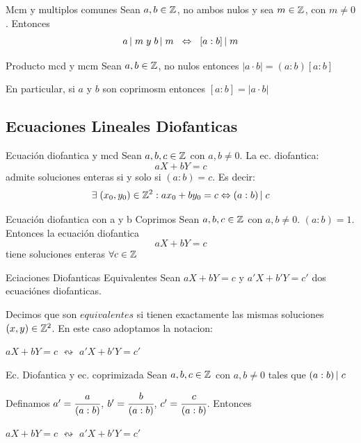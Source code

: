 \documentclass[10pt]{article}
\begin{document}
\begin{cor}{Mcm y multiplos comunes}
 Sean $a, b \in \entero{}$, no ambos nulos y sea $m \in \entero{}$, con $m \neq 0$. Entonces
 \[\divi{a}{m} \es{0.1} y \es{0.1} \divi{b}{m} \es{0.2} \sii \es{0.2}\divi{[a:b]}{m}\]
\end{cor}

\begin{propo}{Producto mcd y mcm}
Sean $a, b \in \entero{}$, no nulos entonces $|a \cdot b| = (a:b)[a:b]$

En particular, si $a$ y $b$ son coprimosm entonces $[a:b] = |a \cdot b|$
\end{propo}

\begin{center}
\subsection{Ecuaciones Lineales Diofanticas} 
\end{center}

\begin{propo}{Ecuación diofantica y mcd}
Sean $a,b,c \in \entero{}$ con $a,b \neq 0$. La ec. diofantica:
\[aX + bY =c\]
admite soluciones enteras si y solo si $(a:b) = c$. Es decir:
\[\exists \es{0.1} (x_0, y_0) \in \entero{2} : a x_0 + b y_0 = c \sii \divi{(a:b)}{c}\]
\end{propo}

\begin{cor}{Ecuación diofantica con a y b Coprimos}
 Sean $a,b,c \in \entero{}$ con $a,b \neq 0$. $(a:b)=1$. Entonces la ecuación diofantica
\[aX + bY =c\]
tiene soluciones enteras $\forall c \in \entero{}$
 \end{cor}

 \begin{defi}{Eciaciones Diofanticas Equivalentes}
  Sean $aX + bY =c$ y $a'X + b'Y =c'$ dos ecuaciónes diofanticas. 
  
  Decimos que son $equivalentes$ si tienen exactamente las mismas soluciones $(x,y) \in \entero{2}$. En este caso adoptamos la notacion:
  \begin{center}
   $aX + bY =c$ $\leftrightsquigarrow$ $a'X + b'Y =c'$
  \end{center}
 \end{defi}

 \begin{obs}{Ec. Diofantica y ec. coprimizada}
   Sean $a,b,c \in \entero{}$ con $a,b \neq 0$ tales que $\divi{(a:b)}{c}$ 
   
   Definamos $a' = \cfrac{a}{(a:b)}$, $b' = \cfrac{b}{(a:b)}$, $c' = \cfrac{c}{(a:b)}$. Entonces
   \begin{center}
   $aX + bY =c$ $\leftrightsquigarrow$ $a'X + b'Y =c'$
  \end{center}
 \end{obs}
\end{document}
